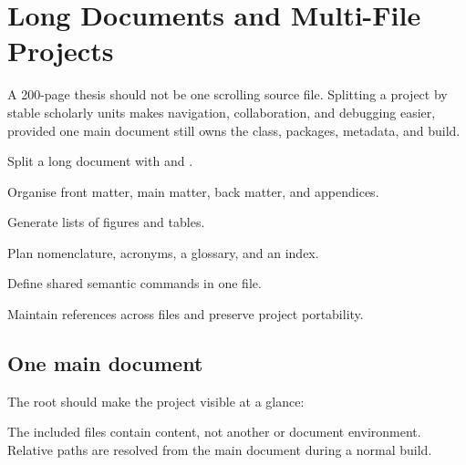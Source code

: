 \chapter{Long Documents and Multi-File Projects}
\label{chap:long-documents}

A 200-page thesis should not be one scrolling source file. Splitting a project
by stable scholarly units makes navigation, collaboration, and debugging
easier, provided one main document still owns the class, packages, metadata,
and build.

\begin{learningoutcomes}
  \item Split a long document with  and .
  \item Organise front matter, main matter, back matter, and appendices.
  \item Generate lists of figures and tables.
  \item Plan nomenclature, acronyms, a glossary, and an index.
  \item Define shared semantic commands in one file.
  \item Maintain references across files and preserve project portability.
\end{learningoutcomes}

\section{One main document}

The root  should make the project visible at a glance:


The included files contain content, not another  or document
environment. Relative paths are resolved from the main document during a normal
build.

